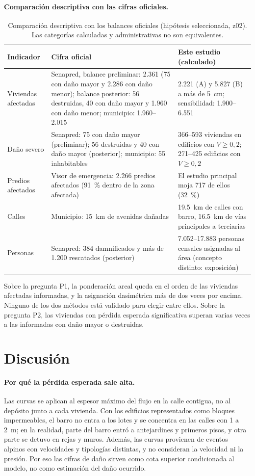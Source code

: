 \documentclass[10pt,a4paper]{article}
\begin{document}
\paragraph{Comparación descriptiva con las cifras oficiales.}
\begin{table}[htbp]\centering\small
\caption{Comparación descriptiva con los balances oficiales (hipótesis seleccionada, z02). Las categorías calculadas y administrativas no son equivalentes.}\label{tab:contraste}
\begin{tabular}{p{}p{}p{}}\toprule
Indicador & Cifra oficial & Este estudio (calculado)\\\midrule
Viviendas afectadas & Senapred, balance preliminar: 2.361 (75 con daño mayor y 2.286 con daño menor); balance posterior: 56 destruidas, 40 con daño mayor y 1.960 con daño menor; municipio: 1.960--2.015 & 2.221 (A) y 5.827 (B) a más de \SI{5}{cm}; sensibilidad: 1.900--6.551\\
Daño severo & Senapred: 75 con daño mayor (preliminar); 56 destruidas y 40 con daño mayor (posterior); municipio: 55 inhabitables & 366--593 viviendas en edificios con $V\geq0{,}2$; 271--425 edificios con $V\geq0{,}2$\\
Predios afectados & Visor de emergencia: 2.266 predios afectados (91~\% dentro de la zona afectada) & El estudio principal moja 717 de ellos (32~\%)\\
Calles & Municipio: \SI{15}{km} de avenidas dañadas & \SI{19,5}{km} de calles con barro, \SI{16,5}{km} de vías principales a terciarias\\
Personas & Senapred: 384 damnificados y más de 1.200 rescatados (posterior) & 7.052--17.883 personas censales asignadas al área (concepto distinto: exposición)\\
\bottomrule\end{tabular}\end{table}
\noindent Sobre la pregunta P1, la ponderación areal queda en el orden de las viviendas afectadas informadas, y la asignación dasimétrica más de dos veces por encima. Ninguno de los dos métodos está validado para elegir entre ellos. Sobre la pregunta P2, las viviendas con pérdida esperada significativa superan varias veces a las informadas con daño mayor o destruidas.

\section{Discusión}
\paragraph{Por qué la pérdida esperada sale alta.} Las curvas se aplican al espesor máximo del flujo en la calle contigua, no al depósito junto a cada vivienda. Con los edificios representados como bloques impermeables, el barro no entra a los lotes y se concentra en las calles con 1 a \SI{2}{m}; en la realidad, parte del barro entró a antejardines y primeros pisos, y otra parte se detuvo en rejas y muros. Además, las curvas provienen de eventos alpinos con velocidades y tipologías distintas, y no consideran la velocidad ni la presión. Por eso las cifras de daño sirven como cota superior condicionada al modelo, no como estimación del daño ocurrido.
\end{document}
